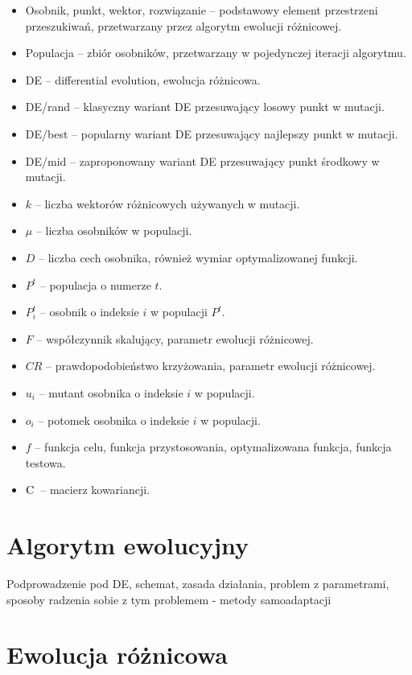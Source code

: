 \documentclass[a4paper,onecolumn,oneside,11pt,wide,floatssmall]{mwrep}
\def\C{{\rm C}\,}
\theoremstyle{definition}
\theoremstyle{plain}%
\theoremstyle{remark}
\begin{document}
\begin{itemize}
 \item[] Osobnik, punkt, wektor, rozwiązanie -- podstawowy element przestrzeni przeszukiwań, 
przetwarzany przez algorytm ewolucji różnicowej.
 \item[] Populacja -- zbiór osobników, przetwarzany w pojedynczej iteracji algorytmu.
 \item[] DE -- differential evolution, ewolucja różnicowa.
 \item[] DE/rand -- klasyczny wariant DE przesuwający losowy punkt w mutacji.
 \item[] DE/best -- popularny wariant DE przesuwający najlepszy punkt w mutacji.
 \item[] DE/mid -- zaproponowany wariant DE przesuwający punkt środkowy w mutacji.
 \item[] $k$ -- liczba wektorów różnicowych używanych w mutacji.
 \item[] $\mu$ -- liczba osobników w populacji.
 \item[] $D$ -- liczba cech osobnika, również wymiar optymalizowanej funkcji.
 \item[] $P^t$ -- populacja o numerze $t$.
 \item[] $P_i^t$ -- osobnik o indeksie $i$ w populacji $P^t$.
 \item[] $F$ -- współczynnik skalujący, parametr ewolucji różnicowej.
 \item[] $CR$ -- prawdopodobieństwo krzyżowania, parametr ewolucji różnicowej.
 \item[] $u_i$ -- mutant osobnika o indeksie $i$ w populacji.
 \item[] $o_i$ -- potomek osobnika o indeksie $i$ w populacji.
 \item[] $f$ -- funkcja celu, funkcja przystosowania, optymalizowana funkcja, funkcja testowa.
 \item[] $\C$ -- macierz kowariancji.
\end{itemize}

\chapter{Algorytm ewolucyjny}

Podprowadzenie pod DE, schemat, zasada działania, problem z parametrami, sposoby radzenia sobie z tym
problemem - metody samoadaptacji 

\chapter{Ewolucja różnicowa}
\end{document}

